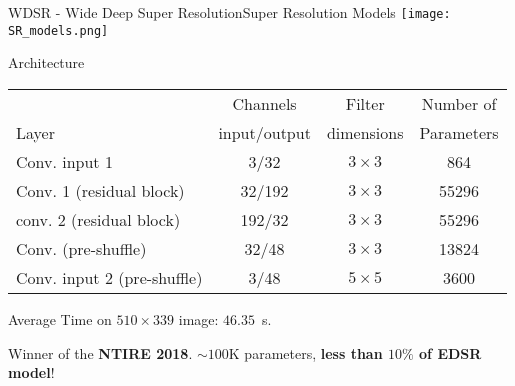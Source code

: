 \documentclass[10pt, technote, oribibl, unicode]{beamer}
\begin{document}
\begin{frame}{WDSR - Wide Deep Super Resolution}{Super Resolution Models}
  \centering
  \texttt{[image: SR\_models.png]}


  \begin{block}{Architecture}
    \scriptsize{
    \begin{tabular}{lccc}
      \hline \rowcolor{NormalBlue}
                                  &  Channels     & Filter     & Number of    \\
      \rowcolor{NormalBlue}
      Layer                       & input/output  & dimensions & Parameters   \\
      \hline
      Conv. input 1               & 3/32       & $3\times3$   & 864     \\
      Conv. 1 (residual block)    & 32/192     & $3\times3$   & 55296   \\
      conv. 2 (residual block)    & 192/32     & $3\times3$   & 55296   \\
      Conv. (pre-shuffle)         & 32/48      & $3\times3$   & 13824   \\
      Conv. input 2 (pre-shuffle) & 3/48       & $5\times5$   & 3600    \\
      \hline
    \end{tabular}
    }

    \vspace{0.5cm}
    \scriptsize{Average Time on $510\times339$ image: $46.35$~s.}

    \scriptsize{Winner of the \textbf{NTIRE 2018}. $\sim100$K parameters, \textbf{less than $10\%$ of EDSR model}!}
  \end{block}

\end{frame}
\end{document}

